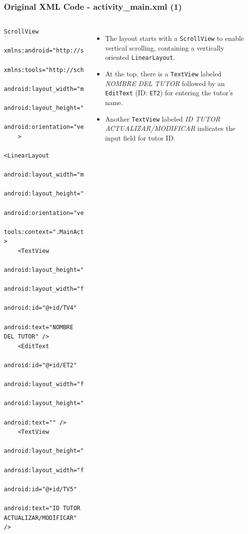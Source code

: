 \documentclass[pdf,
serif,
compress,
xcolor=table,
dvipsnames,
spanish,
aspectratio=169]{beamer}
\begin{document}
\begin{frame}[fragile]
    \frametitle{Original XML Code - activity\_main.xml (1)}    
\begin{columns}


    \begin{verbatim}
ScrollView
    xmlns:android="http://schemas.android.com/apk/res/android"
    xmlns:tools="http://schemas.android.com/tools"
    android:layout_width="match_parent"
    android:layout_height="match_parent"
    android:orientation="vertical"  
    >
    
<LinearLayout 
    android:layout_width="match_parent"
    android:layout_height="match_parent"
    android:orientation="vertical"
    tools:context=".MainActivity" >
    <TextView	            
        android:layout_height="wrap_content"
        android:layout_width="fill_parent"
        android:id="@+id/TV4"
        android:text="NOMBRE DEL TUTOR" />
    <EditText
        android:id="@+id/ET2"        
        android:layout_width="fill_parent"
        android:layout_height="wrap_content"
        android:text="" />
    <TextView
        android:layout_height="wrap_content"
        android:layout_width="fill_parent"
        android:id="@+id/TV5"
        android:text="ID TUTOR ACTUALIZAR/MODIFICAR" />
    \end{verbatim}
\begin{itemize}\tiny
        \item The layout starts with a \texttt{ScrollView} to enable vertical scrolling, containing a vertically oriented \texttt{LinearLayout}.
        \item At the top, there is a \texttt{TextView} labeled \emph{NOMBRE DEL TUTOR} followed by an \texttt{EditText} (ID: \texttt{ET2}) for entering the tutor's name.
        \item Another \texttt{TextView} labeled \emph{ID TUTOR ACTUALIZAR/MODIFICAR} indicates the input field for tutor ID.
    \end{itemize}
\end{columns}  
\end{frame}
\end{document}
